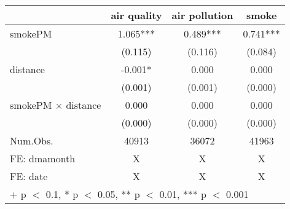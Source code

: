 \begin{table}
\centering
\begin{tabular}[t]{lccc}
\toprule
  & air quality & air pollution & smoke\\
\midrule
smokePM & 1.065*** & 0.489*** & 0.741***\\
 & (0.115) & (0.116) & (0.084)\\
distance & -0.001* & 0.000 & 0.000\\
 & (0.001) & (0.001) & (0.000)\\
smokePM × distance & 0.000 & 0.000 & 0.000\\
 & (0.000) & (0.000) & (0.000)\\
\midrule
Num.Obs. & 40913 & 36072 & 41963\\
FE: dmamonth & X & X & X\\
FE: date & X & X & X\\
\bottomrule
\multicolumn{4}{l}{\rule{0pt}{1em}+ p $<$ 0.1, * p $<$ 0.05, ** p $<$ 0.01, *** p $<$ 0.001}\\
\end{tabular}
\end{table}
